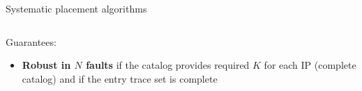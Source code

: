 \begin{frame}[fragile]{Systematic placement algorithms}
\begin{columns}
\begin{column}{0.5\textwidth}
\begin{tiny}
                \vspace{0.6cm}
                 {
                    Guarantees:
                    \begin{itemize}
                        \item \textbf{Robust in $N$ faults} if the catalog provides required $K$ for each IP (complete catalog) and if the entry trace set is complete
                    \end{itemize}
                }
                \vfill
            \end{tiny}
        \end{column}
    \end{columns}
\end{frame}

